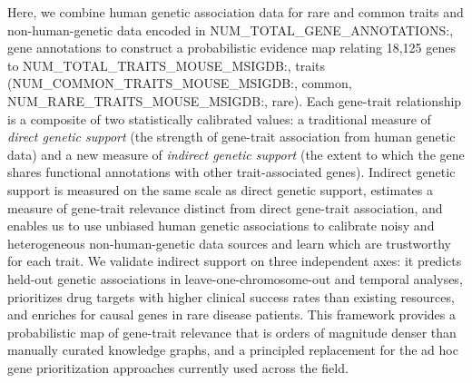 Here, we combine human genetic association data for rare and common traits and non-human-genetic data encoded in {{NUM_TOTAL_GENE_ANNOTATIONS:,}} gene annotations to construct a probabilistic evidence map relating 18,125 genes to {{NUM_TOTAL_TRAITS_MOUSE_MSIGDB:,}} traits ({{NUM_COMMON_TRAITS_MOUSE_MSIGDB:,}} common, {{NUM_RARE_TRAITS_MOUSE_MSIGDB:,}} rare). Each gene-trait relationship is a composite of two statistically calibrated values: a traditional measure of \textit{direct genetic support} (the strength of gene-trait association from human genetic data) and a new measure of \textit{indirect genetic support} (the extent to which the gene shares functional annotations with other trait-associated genes). Indirect genetic support is measured on the same scale as direct genetic support, estimates a measure of gene-trait relevance distinct from direct gene-trait association, and enables us to use unbiased human genetic associations to calibrate noisy and heterogeneous non-human-genetic data sources and learn which are trustworthy for each trait. We validate indirect support on three independent axes: it predicts held-out genetic associations in leave-one-chromosome-out and temporal analyses, prioritizes drug targets with higher clinical success rates than existing resources, and enriches for causal genes in rare disease patients. This framework provides a probabilistic map of gene-trait relevance that is orders of magnitude denser than manually curated knowledge graphs, and a principled replacement for the ad hoc gene prioritization approaches currently used across the field.

